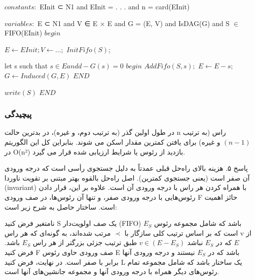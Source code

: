 \documentclass{book} %
\begin{document}
\begin{latin}
    
    \begin{algorithm}
        \begin{algorithmic}
            \STATE $constants:$
            \STATE EInit ⊂ N1 and EInit = {. . .} and n = card(EInit)

            \STATE $variables:$
            \STATE E ⊂ N1 and V ∈ E × E and G = (E, V) and IsDAG(G) and
            \STATE S $\in$ FIFO(EInit)
            \STATE $begin$

            \STATE $E \leftarrow EInit; V \leftarrow {. . .};$
            \STATE $InitFifo(S);$

                \STATE let s such that
                \STATE $s \in E and d - G (s) = 0$
                \STATE $begin$
                \STATE $AddFifo(S, s);$
                \STATE $E \leftarrow E - {s};$
                \STATE $G \leftarrow Induced(G, E)$
                \STATE $END$

            \ENDWHILE
            \STATE $write(S)$
            \STATE $END$

        
        \end{algorithmic}
    \end{algorithm}
        
\end{latin}

\subsubsection*{پیچیدگی}

در طول اولین گذر (به ترتیب دوم، و غیره)، در بدترین حالت n راس (به ترتیب $(n - 1)$ و غیره) برای یافتن کمترین مقدار اسکن می شوند. بنابراین کل این الگوریتم در O(n²) بازدید از رئوس یا شرایط ارزیابی شده قرار می گیرد.

پاسخ ۵.
هزینه بالای راه‌حل قبلی عمدتاً به دلیل جستجوی رأسی است که درجه ورودی آن صفر است (یعنی جستجوی کمترین). اصل راه‌حل بالقوه بهتر مبتنی بر تقویت ناوردا (invariant) با همراه کردن هر راس با درجه ورودی آن است. علاوه بر این، قرار دادن رئوس‌هایی با درجه ورودی صفر، و تنها آن رئوس‌ها، در صف ورودی F حائز اهمیت است. ساختار حاصل به شرح زیر است:

نامتغیر 
فرض کنید S یک صف اولویت‌دار (FIFO) باشد که شامل مجموعه رئوس $E_{S}$ است که بر اساس ترتیب کلی سازگار با $\prec$ مرتب شده‌اند، به گونه‌ای که هر راس v از $E$ که در $E_{S}$ نباشد $v \in (E - E_{S} )$ طبق ترتیب جزئی بزرگتر از هر راس $E_{S}$ باشد. فرض کنید F صف ورودی حاوی رئوس E باشد که در $E_{S}$ نیستند و درجه ورودی آنها برابر با صفر است. در نهایت، فرض کنید L یک ساختار باشد که شامل مجموعه تمام رئوس‌های دیگر همراه با درجه ورودی آنها و مجموعه جانشین‌های آنها است.
\end{document}
